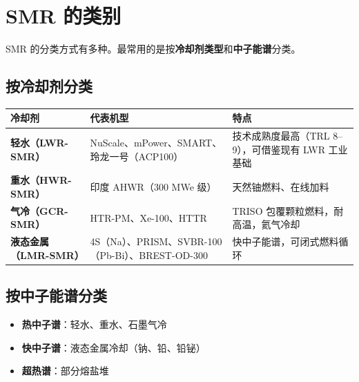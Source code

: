 \documentclass[
  UTF8,
  scheme=plain,
  fontsize=10pt,
  openany
]{ctexbook}
\begin{document}
\section{SMR 的类别}\label{smr-ux7684ux7c7bux522b}

SMR
的分类方式有多种。最常用的是按\textbf{冷却剂类型}和\textbf{中子能谱}分类。

\subsection{按冷却剂分类}\label{ux6309ux51b7ux5374ux5242ux5206ux7c7b}

{\def\LTcaptype{none} %
\begin{longtable}[]{@{}
  >{\raggedright\arraybackslash}p{}
  >{\raggedright\arraybackslash}p{}
  >{\raggedright\arraybackslash}p{}@{}}
\toprule\noalign{}
\begin{minipage}[b]{\linewidth}\raggedright
冷却剂
\end{minipage} & \begin{minipage}[b]{\linewidth}\raggedright
代表机型
\end{minipage} & \begin{minipage}[b]{\linewidth}\raggedright
特点
\end{minipage} \\
\midrule\noalign{}
\endhead
\bottomrule\noalign{}
\endlastfoot
\textbf{轻水（LWR-SMR）} & NuScale、mPower、SMART、玲龙一号（ACP100） &
技术成熟度最高（TRL 8--9），可借鉴现有 LWR 工业基础 \\
\textbf{重水（HWR-SMR）} & 印度 AHWR（300 MWe 级） &
天然铀燃料、在线加料 \\
\textbf{气冷（GCR-SMR）} & HTR-PM、Xe-100、HTTR & TRISO
包覆颗粒燃料，耐高温，氦气冷却 \\
\textbf{液态金属（LMR-SMR）} &
4S（Na）、PRISM、SVBR-100（Pb-Bi）、BREST-OD-300 &
快中子能谱，可闭式燃料循环 \\
\end{longtable}
}

\subsection{按中子能谱分类}\label{ux6309ux4e2dux5b50ux80fdux8c31ux5206ux7c7b}

\begin{itemize}
\tightlist
\item
  \textbf{热中子谱}：轻水、重水、石墨气冷
\item
  \textbf{快中子谱}：液态金属冷却（钠、铅、铅铋）
\item
  \textbf{超热谱}：部分熔盐堆
\end{itemize}
\end{document}
